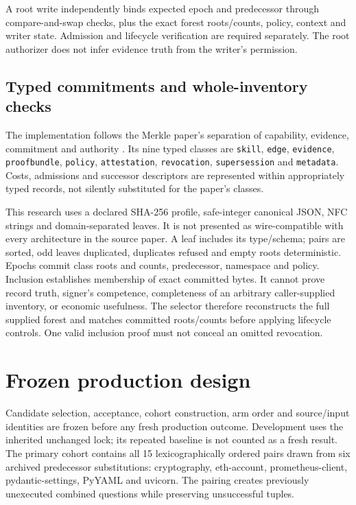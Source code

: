 \documentclass[11pt,a4paper]{article}
\newcommand{\code}[1]{\nolinkurl{#1}}
\begin{document}
A root write independently binds expected epoch and predecessor through compare-and-swap checks, plus the exact forest roots/counts, policy, context and writer state. Admission and lifecycle verification are required separately. The root authorizer does not infer evidence truth from the writer's permission.

\subsection{Typed commitments and whole-inventory checks}
The implementation follows the Merkle paper's separation of capability, evidence, commitment and authority \citep[§§1,5, pp.~2--3,5]{merkle}. Its nine typed classes are \code{skill}, \code{edge}, \code{evidence}, \code{proofbundle}, \code{policy}, \code{attestation}, \code{revocation}, \code{supersession} and \code{metadata}. Costs, admissions and successor descriptors are represented within appropriately typed records, not silently substituted for the paper's classes.

This research uses a declared SHA-256 profile, safe-integer canonical JSON, NFC strings and domain-separated leaves. It is not presented as wire-compatible with every architecture in the source paper. A leaf includes its type/schema; pairs are sorted, odd leaves duplicated, duplicates refused and empty roots deterministic. Epochs commit class roots and counts, predecessor, namespace and policy. Inclusion establishes membership of exact committed bytes. It cannot prove record truth, signer's competence, completeness of an arbitrary caller-supplied inventory, or economic usefulness. The selector therefore reconstructs the full supplied forest and matches committed roots/counts before applying lifecycle controls. One valid inclusion proof must not conceal an omitted revocation.

\section{Frozen production design}
\label{sec:design}
Candidate selection, acceptance, cohort construction, arm order and source/input identities are frozen before any fresh production outcome. Development uses the inherited unchanged lock; its repeated baseline is not counted as a fresh result. The primary cohort contains all 15 lexicographically ordered pairs drawn from six archived predecessor substitutions: cryptography, eth-account, prometheus-client, pydantic-settings, PyYAML and uvicorn. The pairing creates previously unexecuted combined questions while preserving unsuccessful tuples.
\end{document}
